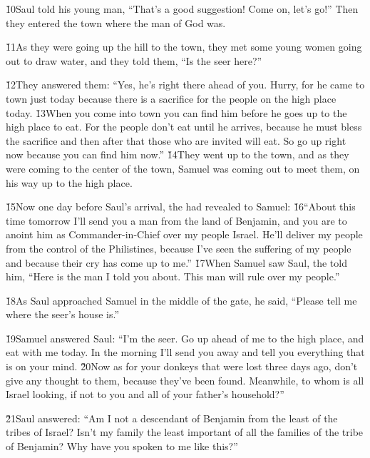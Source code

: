 \v{10}Saul told his young man, ``That's a good suggestion! Come on, let's go!'' Then they entered the town where the man of God was.

\v{11}As they were going up the hill to the town, they met some young women going out to draw water, and they told them, ``Is the seer here?''

\v{12}They answered them: ``Yes, he's right there ahead of you. Hurry, for he came to town just today because there is a sacrifice for the people on the high place today. \v{13}When you come into town you can find him before he goes up to the high place to eat. For the people don't eat until he arrives, because he must bless the sacrifice and then after that those who are invited will eat. So go up right now because you can find him now.'' \v{14}They went up to the town, and as they were coming to the center of the town, Samuel was coming out to meet them, on his way up to the high place.

\v{15}Now one day before Saul's arrival, the  had revealed to Samuel: \v{16}``About this time tomorrow I'll send you a man from the land of Benjamin, and you are to anoint him as Commander-in-Chief over my people Israel. He'll deliver my people from the control of the Philistines, because I've seen the suffering of my people and because their cry has come up to me.'' \v{17}When Samuel saw Saul, the  told him, ``Here is the man I told you about. This man will rule over my people.''

\v{18}As Saul approached Samuel in the middle of the gate, he said, ``Please tell me where the seer's house is.''

\v{19}Samuel answered Saul: ``I'm the seer. Go up ahead of me to the high place, and eat with me today. In the morning I'll send you away and tell you everything that is on your mind. \v{20}Now as for your donkeys that were lost three days ago, don't give any thought to them, because they've been found. Meanwhile, to whom is all Israel looking, if not to you and all of your father's household?''

\v{21}Saul answered: ``Am I not a descendant of Benjamin from the least of the tribes of Israel? Isn't my family the least important of all the families of the tribe of Benjamin? Why have you spoken to me like this?''

